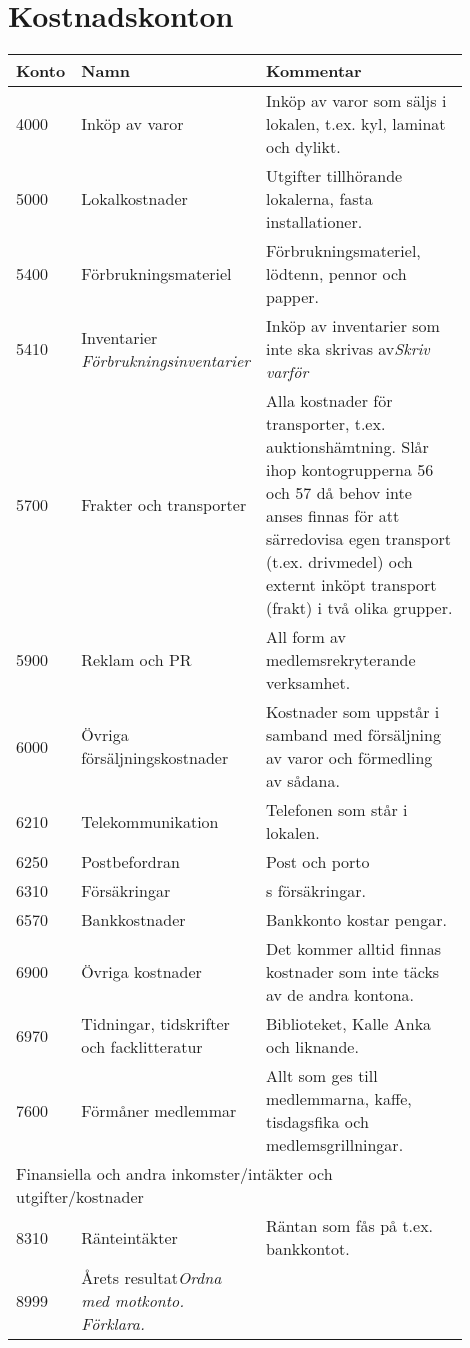 \section{Kostnadskonton}
\begin{minipage}{\fullwidthlength}
	\begin{longtable}[l]{l p{0.4\linewidth} p{0.5\linewidth}}
		Konto	&	Namn								& Kommentar \\ \toprule \endhead
		4000	&	Inköp av varor						& Inköp av varor som säljs i lokalen, t.ex. kyl, laminat och dylikt.\\
		5000	&	Lokalkostnader						& Utgifter tillhörande lokalerna, fasta installationer.\\
		5400	&	Förbrukningsmateriel				& Förbrukningsmateriel, lödtenn, pennor och papper.\\
		5410	&	Inventarier \newline \emph{Förbrukningsinventarier} & Inköp av inventarier som inte ska skrivas av\emph{Skriv varför}\\
		5700	&	Frakter och transporter				& Alla kostnader för transporter, t.ex. auktionshämtning. Slår ihop kontogrupperna 56 och 57 då behov inte anses finnas för att särredovisa egen transport (t.ex. drivmedel) och externt inköpt transport (frakt) i två olika grupper.\\
		5900	&	Reklam och PR						& All form av medlemsrekryterande verksamhet.\\
		6000	&	Övriga försäljningskostnader		& Kostnader som uppstår i samband med försäljning av varor och förmedling av sådana.\\
		6210	&	Telekommunikation					& Telefonen som står i lokalen.\\
		6250	&	Postbefordran						& Post och porto\\
		6310	&	Försäkringar						& \acr{Eta}s försäkringar.\\
		6570	&	Bankkostnader						& Bankkonto kostar pengar.\\
		6900	&	Övriga kostnader					& Det kommer alltid finnas kostnader som inte täcks av de andra kontona.\\
		6970	&	Tidningar, tidskrifter och facklitteratur & Biblioteket, Kalle Anka och liknande.\\
		7600	&	Förmåner medlemmar					& Allt som ges till medlemmarna, kaffe, tisdagsfika och medlemsgrillningar.\\[1.5\baselineskip]
		\multicolumn{3}{l}{Finansiella och andra inkomster/intäkter och utgifter/kostnader}\\ \midrule
		8310	&	Ränteintäkter						& Räntan som fås på t.ex. bankkontot.\\
		8999	&	Årets resultat\emph{Ordna med motkonto. Förklara.}\\
	\end{longtable}
\end{minipage}
